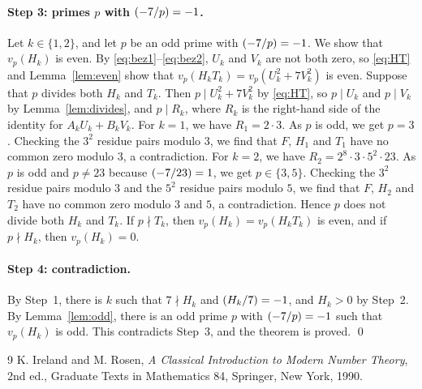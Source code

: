 \documentclass[11pt]{article}
\newcommand{\leg}[2]{\mathchoice{\biggl(\dfrac{#1}{#2}\biggr)}{(#1/#2)}{(#1/#2)}{(#1/#2)}}
\begin{document}
\paragraph{Step 3: primes $p$ with $\leg{-7}{p}=-1$.} Let $k\in\{1,2\}$, and let $p$ be an odd prime with $\leg{-7}{p}=-1$. We show that $v_p(H_k)$ is even. By \eqref{eq:bez1}--\eqref{eq:bez2}, $U_k$ and $V_k$ are not both zero, so \eqref{eq:HT} and Lemma~\ref{lem:even} show that $v_p(H_kT_k)=v_p(U_k^2+7V_k^2)$ is even. Suppose that $p$ divides both $H_k$ and $T_k$. Then $p\mid U_k^2+7V_k^2$ by \eqref{eq:HT}, so $p\mid U_k$ and $p\mid V_k$ by Lemma~\ref{lem:divides}, and $p\mid R_k$, where $R_k$ is the right-hand side of the identity for $A_kU_k+B_kV_k$. For $k=1$, we have $R_{1}=2\cdot 3$. As $p$ is odd, we get $p=3$. Checking the $3^2$ residue pairs modulo $3$, we find that $F$, $H_{1}$ and $T_{1}$ have no common zero modulo $3$, a contradiction. For $k=2$, we have $R_{2}=2^{8}\cdot 3\cdot 5^{2}\cdot 23$. As $p$ is odd and $p\neq23$ because $\leg{-7}{23}=1$, we get $p\in\{3,5\}$. Checking the $3^2$ residue pairs modulo $3$ and the $5^2$ residue pairs modulo $5$, we find that $F$, $H_{2}$ and $T_{2}$ have no common zero modulo $3$ and $5$, a contradiction. Hence $p$ does not divide both $H_k$ and $T_k$. If $p\nmid T_k$, then $v_p(H_k)=v_p(H_kT_k)$ is even, and if $p\nmid H_k$, then $v_p(H_k)=0$.

\paragraph{Step 4: contradiction.} By Step~1, there is $k$ such that $7\nmid H_k$ and $\leg{H_k}{7}=-1$, and $H_k>0$ by Step~2. By Lemma~\ref{lem:odd}, there is an odd prime $p$ with $\leg{-7}{p}=-1$ such that $v_p(H_k)$ is odd. This contradicts Step~3, and the theorem is proved.
\qed

\begin{thebibliography}{9}
 K. Ireland and M. Rosen, \emph{A Classical Introduction to Modern Number Theory}, 2nd ed., Graduate Texts in Mathematics 84, Springer, New York, 1990.
\end{thebibliography}
\end{document}
